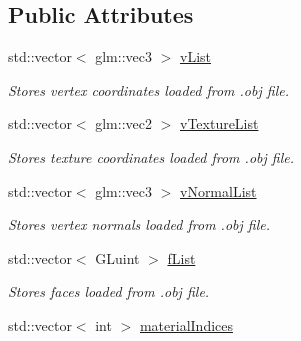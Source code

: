 \subsection*{Public Attributes}
\begin{DoxyCompactItemize}
\item 
std\+::vector$<$ glm\+::vec3 $>$ \hyperlink{class_obj_g_p_u_data_a4479fbcb9ab78bd29f74d768d893123f}{v\+List}\hypertarget{class_obj_g_p_u_data_a4479fbcb9ab78bd29f74d768d893123f}{}\label{class_obj_g_p_u_data_a4479fbcb9ab78bd29f74d768d893123f}

\begin{DoxyCompactList}\small\item\em Stores vertex coordinates loaded from .obj file. \end{DoxyCompactList}\item 
std\+::vector$<$ glm\+::vec2 $>$ \hyperlink{class_obj_g_p_u_data_ab39012ed3e485641f2eda7c7f3de2aec}{v\+Texture\+List}\hypertarget{class_obj_g_p_u_data_ab39012ed3e485641f2eda7c7f3de2aec}{}\label{class_obj_g_p_u_data_ab39012ed3e485641f2eda7c7f3de2aec}

\begin{DoxyCompactList}\small\item\em Stores texture coordinates loaded from .obj file. \end{DoxyCompactList}\item 
std\+::vector$<$ glm\+::vec3 $>$ \hyperlink{class_obj_g_p_u_data_adc7cd78dfb5f2d69998fbdde2e77464f}{v\+Normal\+List}\hypertarget{class_obj_g_p_u_data_adc7cd78dfb5f2d69998fbdde2e77464f}{}\label{class_obj_g_p_u_data_adc7cd78dfb5f2d69998fbdde2e77464f}

\begin{DoxyCompactList}\small\item\em Stores vertex normals loaded from .obj file. \end{DoxyCompactList}\item 
std\+::vector$<$ G\+Luint $>$ \hyperlink{class_obj_g_p_u_data_a2672a6ddbbc6ed386477662f7970ce5f}{f\+List}\hypertarget{class_obj_g_p_u_data_a2672a6ddbbc6ed386477662f7970ce5f}{}\label{class_obj_g_p_u_data_a2672a6ddbbc6ed386477662f7970ce5f}

\begin{DoxyCompactList}\small\item\em Stores faces loaded from .obj file. \end{DoxyCompactList}\item 
std\+::vector$<$ int $>$ \hyperlink{class_obj_g_p_u_data_ab372a052982848b3f1b4d9b316d8d2b5}{material\+Indices}\hypertarget{class_obj_g_p_u_data_ab372a052982848b3f1b4d9b316d8d2b5}{}\label{class_obj_g_p_u_data_ab372a052982848b3f1b4d9b316d8d2b5}


\end{DoxyCompactItemize}
